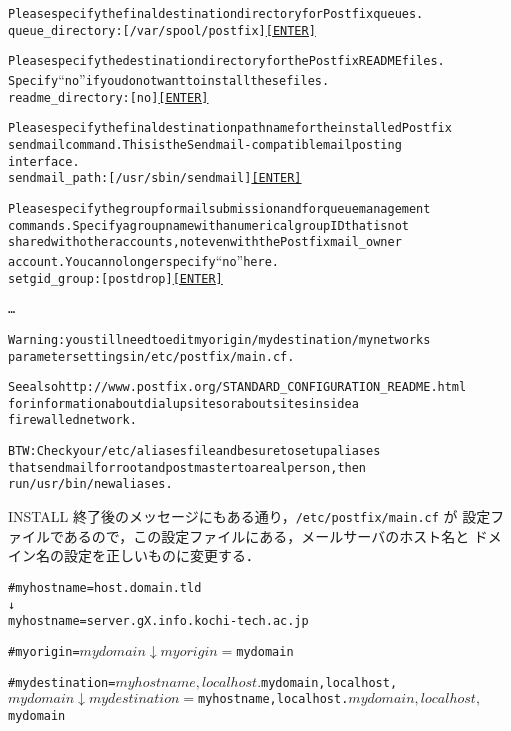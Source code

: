 \begin{center}
\begin{breakbox}
\begin{alltt}
Please specify the final destination directory for Postfix queues.
queue_directory: [/var/spool/postfix]  \underline{[ENTER]}

Please specify the destination directory for the Postfix README files.
Specify ``no'' if you do not want to install these files.
readme_directory: [no]  \underline{[ENTER]}

Please specify the final destination pathname for the installed Postfix
sendmail command. This is the Sendmail-compatible mail posting
interface.
sendmail_path: [/usr/sbin/sendmail]  \underline{[ENTER]}

Please specify the group for mail submission and for queue management
commands. Specify a group name with a numerical group ID that is not
shared with other accounts, not even with the Postfix mail_owner
account. You can no longer specify ``no'' here.
setgid_group: [postdrop]  \underline{[ENTER]}

        …

    Warning: you still need to edit myorigin/mydestination/mynetworks
    parameter settings in /etc/postfix/main.cf.

    See also http://www.postfix.org/STANDARD_CONFIGURATION_README.html
    for information about dialup sites or about sites inside a
    firewalled network.

    BTW: Check your /etc/aliases file and be sure to set up aliases
    that send mail for root and postmaster to a real person, then
    run /usr/bin/newaliases.
\end{alltt}
\end{breakbox}
\end{center}

INSTALL 終了後のメッセージにもある通り，\texttt{/etc/postfix/main.cf} が
設定ファイルであるので，この設定ファイルにある，メールサーバのホスト名と
ドメイン名の設定を正しいものに変更する．

\begin{center}
\begin{breakbox}
\begin{alltt}
#myhostname = host.domain.tld
        ↓
myhostname = server.gX.info.kochi-tech.ac.jp

#myorigin = $mydomain
        ↓
myorigin = $mydomain

#mydestination = $myhostname, localhost.$mydomain, localhost, $mydomain
        ↓
mydestination = $myhostname, localhost.$mydomain, localhost, $mydomain

\end{alltt}
\end{breakbox}
\end{center}

